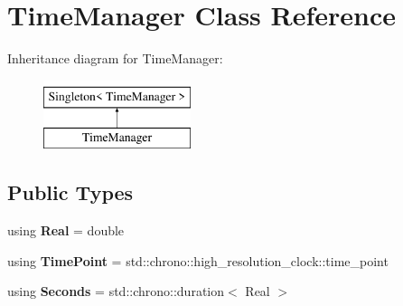 \hypertarget{class_time_manager}{\section{Time\+Manager Class Reference}
\label{class_time_manager}
}
Inheritance diagram for Time\+Manager\+:\begin{figure}[H]
\begin{center}
\leavevmode
\includegraphics[height=2.000000cm]{class_time_manager}
\end{center}
\end{figure}
\subsection*{Public Types}
\begin{DoxyCompactItemize}
\item 
\hypertarget{class_time_manager_a09f5df0345b8e585badbd57cbaf3b506}{using {\bfseries Real} = double}\label{class_time_manager_a09f5df0345b8e585badbd57cbaf3b506}

\item 
\hypertarget{class_time_manager_a4162b0016503de524079dd23e68ba697}{using {\bfseries Time\+Point} = std\+::chrono\+::high\+\_\+resolution\+\_\+clock\+::time\+\_\+point}\label{class_time_manager_a4162b0016503de524079dd23e68ba697}

\item 
\hypertarget{class_time_manager_a93d275e53c96a786c78b9b31cd729fb3}{using {\bfseries Seconds} = std\+::chrono\+::duration$<$ Real $>$}\label{class_time_manager_a93d275e53c96a786c78b9b31cd729fb3}

\end{DoxyCompactItemize}
